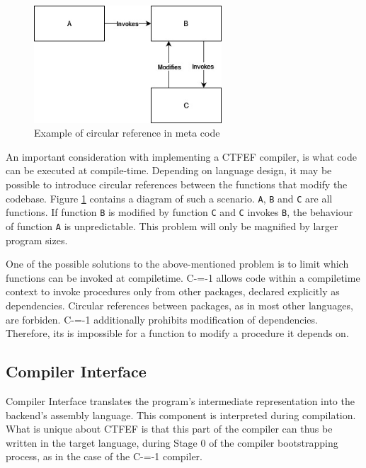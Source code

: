 \begin{figure}
	\includegraphics[width=7cm]{pictures/circular-function-reference.jpg}
	\caption{Example of circular reference in meta code}
	\label{circular-function-reference}
\end{figure}

An important consideration with implementing a CTFEF compiler, is what code can be executed at compile-time.
Depending on language design, it may be possible to introduce circular references between the functions that modify the codebase.
Figure \ref{circular-function-reference} contains a diagram of such a scenario.
\lstinline{A}, \lstinline{B} and \lstinline{C} are all functions.
If function \lstinline{B} is modified by function \lstinline{C} and \lstinline{C} invokes \lstinline{B}, the behaviour of function \lstinline{A} is unpredictable.
This problem will only be magnified by larger program sizes.


One of the possible solutions to the above-mentioned problem is to limit which functions can be invoked at compiletime.
C-=-1 allows code within a compiletime context to invoke procedures only from other packages, declared explicitly as dependencies.
Circular references between packages, as in most other languages, are forbiden.
C-=-1 additionally prohibits modification of dependencies.
Therefore, its is impossible for a function to modify a procedure it depends on.

\subsection{Compiler Interface}
\label{compiler-interface}

Compiler Interface translates the program's intermediate representation into the backend's assembly language.
This component is interpreted during compilation.
What is unique about CTFEF is that this part of the compiler can thus be written in the target language, during Stage 0 of the compiler bootstrapping process, as in the case of the C-=-1 compiler\cite{puntambekar:compiler_design, novillo2007gcc, grabski2022compilation}.

